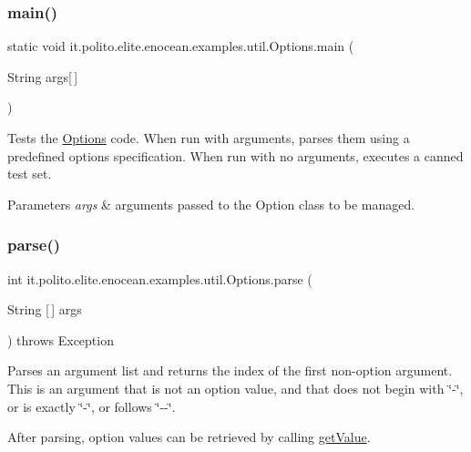 \subsubsection{\texorpdfstring{main()}{main()}}
{\footnotesize\ttfamily static void it.\+polito.\+elite.\+enocean.\+examples.\+util.\+Options.\+main (\begin{DoxyParamCaption}\item[{String}]{args\mbox{[}$\,$\mbox{]} }\end{DoxyParamCaption})\hspace{0.3cm}{\ttfamily [static]}}

Tests the \hyperlink{classit_1_1polito_1_1elite_1_1enocean_1_1examples_1_1util_1_1_options}{Options} code. When run with arguments, parses them using a predefined options specification. When run with no arguments, executes a canned test set. 
\begin{DoxyParams}{Parameters}
{\em args} & arguments passed to the Option class to be managed. \\
\hline
\end{DoxyParams}
\hypertarget{classit_1_1polito_1_1elite_1_1enocean_1_1examples_1_1util_1_1_options_a16d1c95c87bc1b6eeacb20ee90860a05}{}\label{classit_1_1polito_1_1elite_1_1enocean_1_1examples_1_1util_1_1_options_a16d1c95c87bc1b6eeacb20ee90860a05} 
\subsubsection{\texorpdfstring{parse()}{parse()}}
{\footnotesize\ttfamily int it.\+polito.\+elite.\+enocean.\+examples.\+util.\+Options.\+parse (\begin{DoxyParamCaption}\item[{String \mbox{[}$\,$\mbox{]}}]{args }\end{DoxyParamCaption}) throws Exception}

Parses an argument list and returns the index of the first non-\/option argument. This is an argument that is not an option value, and that does not begin with \char`\"{}-\/\char`\"{}, or is exactly \char`\"{}-\/\char`\"{}, or follows \char`\"{}-\/-\/\char`\"{}.

After parsing, option values can be retrieved by calling \hyperlink{classit_1_1polito_1_1elite_1_1enocean_1_1examples_1_1util_1_1_options_a1d7582549531826d41e895665179e3fd}{get\+Value}.

